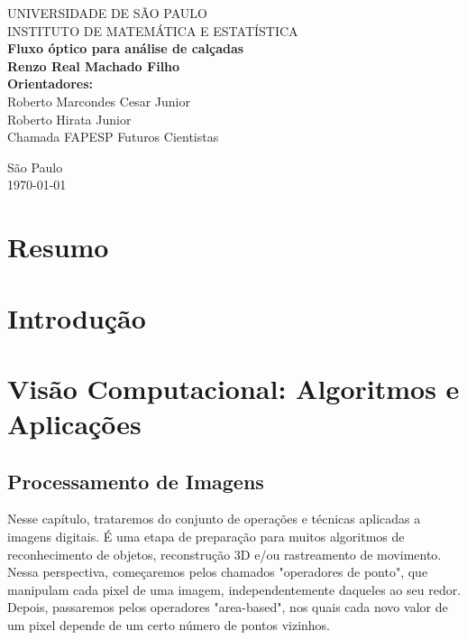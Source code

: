 \documentclass[12pt, a4paper]{article}
\newcommand{\titulopt}{Fluxo óptico para análise de calçadas}
\newcommand{\orientadores}{Roberto Marcondes Cesar Junior \\ Roberto Hirata Junior}
\newcommand{\processo}{ Chamada FAPESP Futuros Cientistas}
\begin{document}
\begin{titlepage}
    \begin{center}
        \large UNIVERSIDADE DE SÃO PAULO\\
        \large INSTITUTO DE MATEMÁTICA E ESTATÍSTICA\\[3cm]


        \textbf{\Large \titulopt}\\[2cm]
        
        
        \textbf{\large Renzo Real Machado Filho}\\[0.5cm]
        \centering \textbf{Orientadores:} \\
        \orientadores \\[3cm]
        
    
        \processo
        \vfill
        
        São Paulo \\ \today
    \end{center}
\end{titlepage}

\section*{Resumo}


\newpage
\tableofcontents
\newpage

\section{Introdução}

\section{Visão Computacional: Algoritmos e Aplicações \cite{szeliski2010}}

\subsection{Processamento de Imagens}

Nesse capítulo, trataremos do conjunto de operações e técnicas aplicadas a imagens digitais. É uma etapa de preparação para muitos algoritmos de reconhecimento de objetos, reconstrução 3D e/ou rastreamento de movimento. Nessa perspectiva, começaremos pelos chamados "operadores de ponto", que manipulam cada pixel de uma imagem, independentemente daqueles ao seu redor. Depois, passaremos pelos operadores "area-based", nos quais cada novo valor de um pixel depende de um certo número de pontos vizinhos.
\end{document}

